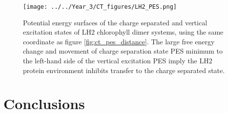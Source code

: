 \begin{figure}
    \centering
    \texttt{[image: ../../Year\_3/CT\_figures/LH2\_PES.png]}
    \label{fig:ct_pes_lh2}
    \caption{Potential energy surfaces of the charge separated and vertical excitation
    states of LH2 chlorophyll dimer systems, using the same coordinate as figure
    \ref{fig:ct_pes_distance}. The large free energy change and movement of charge
    separation state PES minimum to the left-hand side of the vertical excitation 
    PES imply the LH2 protein environment inhibits transfer to the charge separated
    state.}
\end{figure}

\section{Conclusions}

